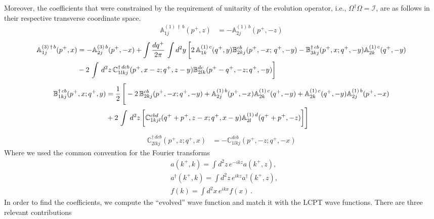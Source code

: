 \documentclass[aps,prd,amsmath,amssymb,nofootinbib]{revtex4-2}
\def\mf#1{\mathbb{#1}}
\numberwithin{equation}{section}
\begin{document}
Moreover, the coefficients that were constrained by the requirement of unitarity of the evolution operator, i.e., $\Omega^{\dagger}\Omega = \mathcal{I}$, are as follows in their respective transverse coordinate space. 
\begin{align}
    \mf{A}^{(1)\, \dagger\,  b}_{1j}(p^{+},z) & =  -\mf{A}^{(1)\, b}_{2j}(p^{+},-z)
\end{align}
\begin{align}
 \mf{A}^{(3)\, \dagger\, b}_{1j}(p^{+},x) & = -\mf{A}^{(3)\, b}_{2j}(p^{+}, -x) +\int \frac{dq^{+}}{2\pi}\, \int d^{2}y\, \bigg[2\, \mf{A}^{(1)\, c}_{1k}(q^{+}, y)\mf{B}^{cb}_{2kj}(p^{+}, -x;\, q^{+},-y)-\mf{B}^{\dagger\, cb}_{3kj}(p^{+}, x; q^{+}, -y)\mf{A}^{(1)\,c}_{2k}(q^{+},-y)\notag \\ & -2\,\int\, d^{2}z\, \mf{C}^{\dagger\, dcb}_{1lkj}(p^{+},x-z; q^{+},z-y)\mf{B}^{dc}_{2lk}(p^{+}-q^{+},-z; q^{+},-y)\bigg]
\end{align}
\begin{align}
    \mf{B}^{\dagger\, cb}_{1kj}(p^{+},x; q^{+},y) & = \frac{1}{2}\, \Bigg[-2\,\mf{B}^{cb}_{2kj}(p^{+},-x; q^{+},-y)+\mf{A}^{(1)\, b}_{2j}(p^{+},-x)\mf{A}^{(1)\, c}_{2k}(q^{+},-y)+ \mf{A}^{(1)\, c}_{2k}(q^{+},-y)\mf{A}^{(1)\, b}_{2j}(p^{+},-x)\notag \\ & +2\,\int\, d^{2}z\, \bigg[\mf{C}^{cbd}_{1kjl}(q^{+}+p^{+},z-x; q^{+},x-y)\mf{A}^{(1)\,d}_{2l}(q^{+}+p^{+},-z)\bigg]\Bigg]
\end{align}
\begin{align}
     \mf{C}^{\dagger\, dcb}_{2lkj}(p^{+},z; q^{+},x) & =  -\mf{C}^{dcb}_{1lkj}(p^{+}, -z; q^{+}, -x)
\end{align}
Where we used the common  convention for the Fourier transforms 
\begin{align}
    &a(k^+, k) = \int d^2z\, e^{-i k z} a(k^+,z), \\ 
    &a^\dagger(k^+, k) = \int d^2z\, e^{i k z} a^\dagger(k^+, z), \\ 
    & f (k) = \int d^2x\, e^{ikx} f(x)\,.
\end{align}
In order to find the coefficients, we compute the ``evolved'' wave function and match it with the LCPT wave functions. There are three relevant contributions 
\end{document}
